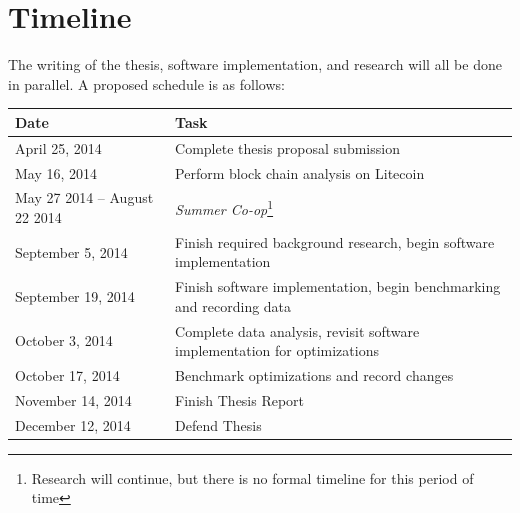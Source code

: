 \documentclass[11pt]{article}
\begin{document}
\section{Timeline}
The writing of the thesis, software implementation, and research will all be
done in parallel. A proposed schedule is as follows:
\begin{center}
\begin{tabularx}{\textwidth}{X|X}
    Date & Task\\
    \hline
    April 25, 2014 & Complete thesis proposal submission\\
    May 16, 2014 & Perform block chain analysis on Litecoin\\
    May 27 2014 -- August 22 2014 & \emph{Summer Co-op}\footnote{Research will
                                    continue, but there is no formal timeline for
                                    this period of time}\\
    September 5, 2014 & Finish required background research, begin software
                        implementation\\
    September 19, 2014 & Finish software implementation, begin benchmarking and
                         recording data\\
    October 3, 2014 & Complete data analysis, revisit software implementation
                      for optimizations\\
    October 17, 2014 & Benchmark optimizations and record changes\\
    November 14, 2014 & Finish Thesis Report\\
    December 12, 2014 & Defend Thesis\\
\end{tabularx}
\end{center}


\end{document}
